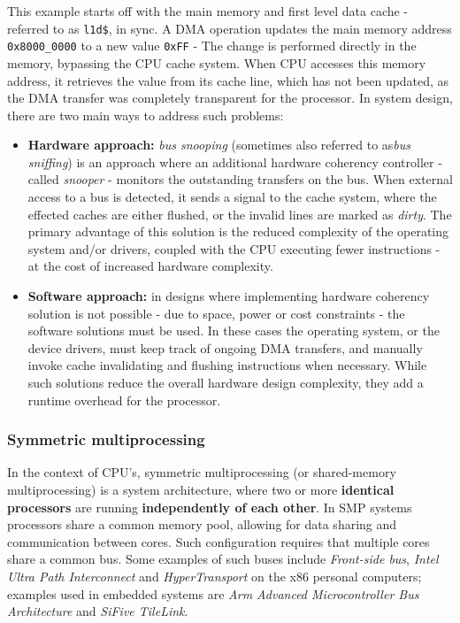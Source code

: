 \noindent This example starts off with the main memory and first level data cache - referred to as \texttt{l1d\$}, in sync.
A DMA operation updates the main memory address \texttt{0x8000\_0000} to a new value \texttt{0xFF} - The change is performed directly
in the memory, bypassing the CPU cache system. When CPU accesses this memory address, it retrieves the value from its
cache line, which has not been updated, as the DMA transfer was completely transparent for the processor.
In system design, there are two main ways to address such problems:

\begin{itemize}
	\item \textbf{Hardware approach:} \textit{bus snooping} (sometimes also referred to as\textit{bus sniffing}) is an %
		approach where an additional hardware coherency controller - called \textit{snooper} - monitors the outstanding
		transfers on the bus. When external access to a bus is detected, it sends a signal to the cache system, where the
		effected caches are either flushed, or the invalid lines are marked as \textit{dirty}. The primary advantage of this solution is the reduced
		complexity of the operating system and/or drivers, coupled with the CPU executing fewer instructions - at the cost of increased hardware complexity. %
	\item \textbf{Software approach:} in designs where implementing hardware coherency solution is not possible - due to space, power or cost constraints -
		the software solutions must be used. In these cases the operating system, or the device drivers, must keep track of ongoing DMA transfers, and manually
		invoke cache invalidating and flushing instructions when necessary. While such solutions reduce the overall hardware design complexity, they add a
		runtime overhead for the processor.
\end{itemize}


\subsubsection{Symmetric multiprocessing}

In the context of CPU's, symmetric multiprocessing (or shared-memory multiprocessing) is a system architecture, where two or more \textbf{identical processors} %
are running \textbf{independently of each other}. In SMP systems processors share a common memory pool, allowing for data sharing and communication
between cores. Such configuration requires that multiple cores share a common bus. Some examples of such buses include \textit{Front-side bus}, \textit{Intel Ultra Path Interconnect} %
and \textit{HyperTransport} on the x86 personal computers; examples used in embedded systems are \textit{Arm Advanced Microcontroller Bus Architecture} and \textit{SiFive TileLink}. %

